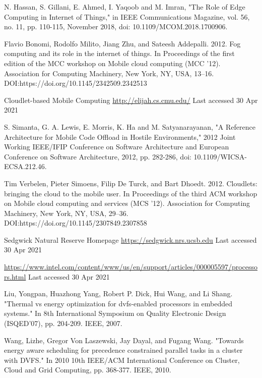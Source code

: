 \documentclass[runningheads]{llncs}
\begin{document}
\begin{thebibliography}{8}

N. Hassan, S. Gillani, E. Ahmed, I. Yaqoob and M. Imran, "The Role of Edge Computing in Internet of Things," in IEEE Communications Magazine, vol. 56, no. 11, pp. 110-115, November 2018, doi: 10.1109/MCOM.2018.1700906.

Flavio Bonomi, Rodolfo Milito, Jiang Zhu, and Sateesh Addepalli. 2012. Fog computing and its role in the internet of things. In Proceedings of the first edition of the MCC workshop on Mobile cloud computing (MCC '12). Association for Computing Machinery, New York, NY, USA, 13–16. DOI:https://doi.org/10.1145/2342509.2342513

Cloudlet-based Mobile Computing
\url {http://elijah.cs.cmu.edu/} Last accessed 30 Apr 2021

S. Simanta, G. A. Lewis, E. Morris, K. Ha and M. Satyanarayanan, "A Reference Architecture for Mobile Code Offload in Hostile Environments," 2012 Joint Working IEEE/IFIP Conference on Software Architecture and European Conference on Software Architecture, 2012, pp. 282-286, doi: 10.1109/WICSA-ECSA.212.46.

Tim Verbelen, Pieter Simoens, Filip De Turck, and Bart Dhoedt. 2012. Cloudlets: bringing the cloud to the mobile user. In Proceedings of the third ACM workshop on Mobile cloud computing and services (MCS '12). Association for Computing Machinery, New York, NY, USA, 29–36. DOI:https://doi.org/10.1145/2307849.2307858

Sedgwick Natural Reserve Homepage \url{https://sedgwick.nrs.ucsb.edu} Last accessed 30 Apr 2021

\url{https://www.intel.com/content/www/us/en/support/articles/000005597/processors.html} Last accessed 30 Apr 2021 


Liu, Yongpan, Huazhong Yang, Robert P. Dick, Hui Wang, and Li Shang. "Thermal vs energy optimization for dvfs-enabled processors in embedded systems." In 8th International Symposium on Quality Electronic Design (ISQED'07), pp. 204-209. IEEE, 2007.


Wang, Lizhe, Gregor Von Laszewski, Jay Dayal, and Fugang Wang. "Towards energy aware scheduling for precedence constrained parallel tasks in a cluster with DVFS." In 2010 10th IEEE/ACM International Conference on Cluster, Cloud and Grid Computing, pp. 368-377. IEEE, 2010.


\end{thebibliography}
\end{document}
